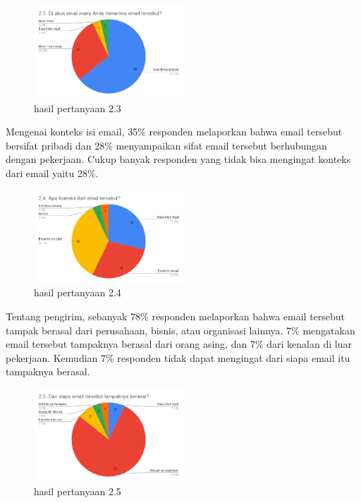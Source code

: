 \documentclass[lettersize,journal]{IEEEtran}
\begin{document}
\begin{figure}[h!]
  \centering
  \includegraphics[width=0.5\textwidth]{image/2.3.png}
  \caption{hasil pertanyaan 2.3}
  \label{fig:pertanyaan_2.3}
\end{figure}

Mengenai konteks isi email, 35\% responden melaporkan bahwa email tersebut bersifat pribadi 
dan 28\% menyampaikan sifat email tersebut berhubungan dengan pekerjaan.
Cukup banyak responden yang tidak bisa mengingat konteks dari email yaitu 28\%.

\begin{figure}[h!]
  \centering
  \includegraphics[width=0.5\textwidth]{image/2.4.png}
  \caption{hasil pertanyaan 2.4}
  \label{fig:pertanyaan_2.4}
\end{figure}

Tentang pengirim, sebanyak 78\% responden melaporkan bahwa email tersebut tampak berasal dari 
perusahaan, bisnis, atau organisasi lainnya. 7\% mengatakan email tersebut tampaknya berasal dari
orang asing, dan 7\% dari kenalan di luar pekerjaan. Kemudian
7\% responden tidak dapat mengingat dari siapa email itu tampaknya 
berasal. 

\begin{figure}[h!]
  \centering
  \includegraphics[width=0.5\textwidth]{image/2.5.png}
  \caption{hasil pertanyaan 2.5}
  \label{fig:pertanyaan_2.5}
\end{figure}
\end{document}
